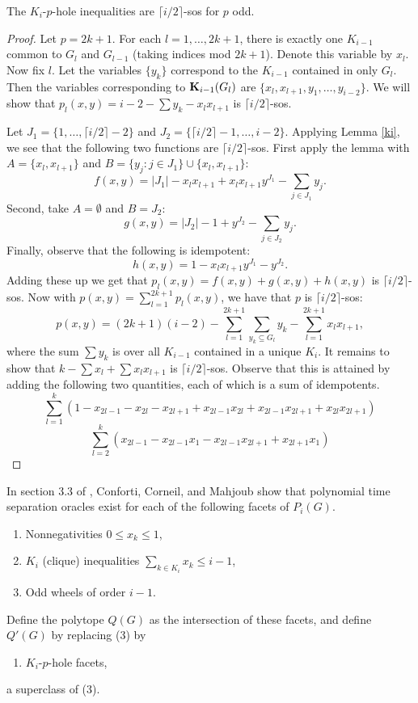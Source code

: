 \begin{lemma}\label{kiphole}
The $K_i$-$p$-hole inequalities are $\lceil i/2 \rceil$-sos for $p$ odd.
\end{lemma}
\begin{proof}

Let $p = 2k+1$. For each $l=1,\ldots,2k+1$, there is exactly one $K_{i-1}$ common to $G_l$ and $G_{l-1}$ (taking indices mod $2k+1$). Denote this variable by $x_l$. Now fix $l$. Let the variables $\{y_k\}$ correspond to the $K_{i-1}$ contained in only $G_l$. Then the variables corresponding to $\mathbf{K}_{i-1}(G_l)$ are $\{x_l,x_{l+1},y_1,\ldots,y_{i-2}\}$. We will show that $p_l(x,y) = i-2 - \sum y_k - x_lx_{l+1}$ is $\lceil i/2 \rceil$-sos.

Let $J_1 = \{1,\ldots,\lceil i/2 \rceil - 2\}$ and $J_2 = \{\lceil i/2 \rceil - 1, \ldots,i-2\}$. Applying Lemma \ref{ki}, we see that the following two functions are $\lceil i/2 \rceil$-sos. First apply the lemma with $A = \{x_l,x_{l+1}\}$ and $B = \{y_j: j \in J_1\} \cup \{x_l,x_{l+1}\}$:
$$f(x,y)=|J_1| - x_lx_{l+1} + x_lx_{l+1}y^{J_1}- \sum_{j \in J_1} y_j .$$
Second, take $A = \emptyset$ and $B = J_2$:
$$g(x,y)=|J_2| - 1  + y^{J_2}- \sum_{j \in J_2} y_j .$$
Finally, observe that the following is idempotent:
$$h(x,y) = 1-x_lx_{l+1}y^{J_1} - y^{J_2}.$$
Adding these up we get that $p_l(x,y) = f(x,y)+g(x,y)+h(x,y)$ is $\lceil i/2 \rceil$-sos. Now with $p(x,y) = \sum_{l=1}^{2k+1} p_l(x,y)$, we have that $p$ is $\lceil i/2 \rceil$-sos:
$$p(x,y) = (2k+1)(i-2) - \sum_{l=1}^{2k+1}\sum_{y_k \subseteq G_l}y_k - \sum_{l=1}^{2k+1}x_lx_{l+1},$$
where the sum $\sum y_k$ is over all $K_{i-1}$ contained in a unique $K_i$. It remains to show that $k-\sum x_l + \sum x_lx_{l+1}$ is $\lceil i/2 \rceil$-sos. Observe that this is attained by adding the following two quantities, each of which is a sum of idempotents.
$$ \sum_{l=1}^k \left(1 - x_{2l-1} - x_{2l} - x_{2l+1} + x_{2l-1}x_{2l} + x_{2l-1}x_{2l+1} + x_{2l}x_{2l+1}\right)$$
$$ \sum_{l=2}^k (x_{2l-1} - x_{2l-1}x_{1} - x_{2l-1}x_{2l+1} + x_{2l+1}x_{1})$$
\end{proof}

In section 3.3 of \cite{conforti}, Conforti, Corneil, and Mahjoub show that polynomial time separation oracles exist for each of the following facets of $P_i(G)$.
\begin{enumerate}
\item Nonnegativities $0 \le x_k \le 1$,
\item $K_i$ (clique) inequalities $\sum_{k \in K_i}x_k \le i-1$,
\item Odd wheels of order $i-1$.
\end{enumerate}
Define the polytope $Q(G)$ as the intersection of these facets, and define $Q'(G)$ by replacing (3) by 
\begin{enumerate}[label=(\arabic*$'$),ref=(\arabic*$'$),start=3]
\item $K_i$-$p$-hole facets,
\end{enumerate}
a superclass of (3).

